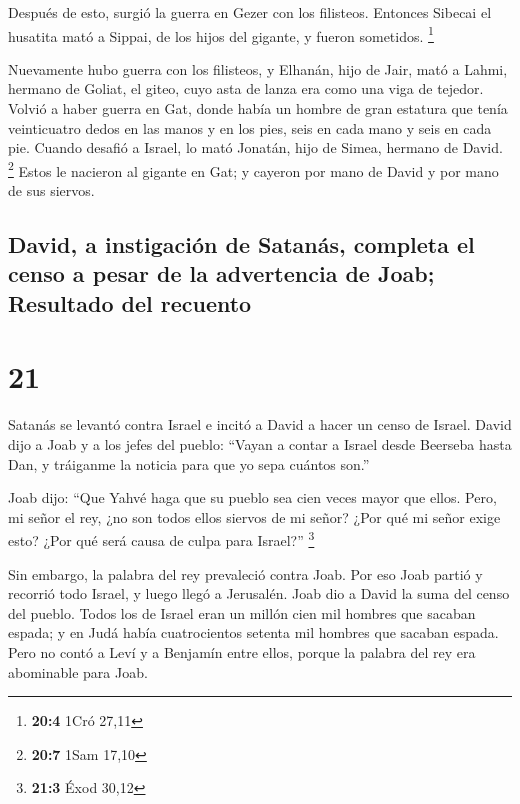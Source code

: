  Después de esto, surgió la guerra en Gezer con los
filisteos. Entonces Sibecai el husatita mató a Sippai, de los hijos del
gigante, y fueron sometidos. \footnote{\textbf{20:4} 1Cró 27,11}

 Nuevamente hubo guerra con los filisteos, y Elhanán, hijo
de Jair, mató a Lahmi, hermano de Goliat, el giteo, cuyo asta de lanza
era como una viga de tejedor.  Volvió a haber guerra en
Gat, donde había un hombre de gran estatura que tenía veinticuatro dedos
en las manos y en los pies, seis en cada mano y seis en cada pie.
 Cuando desafió a Israel, lo mató Jonatán, hijo de Simea,
hermano de David. \footnote{\textbf{20:7} 1Sam 17,10} 
Estos le nacieron al gigante en Gat; y cayeron por mano de David y por
mano de sus siervos.

\hypertarget{david-a-instigaciuxf3n-de-satanuxe1s-completa-el-censo-a-pesar-de-la-advertencia-de-joab-resultado-del-recuento}{%
\subsection{David, a instigación de Satanás, completa el censo a pesar
de la advertencia de Joab; Resultado del
recuento}\label{david-a-instigaciuxf3n-de-satanuxe1s-completa-el-censo-a-pesar-de-la-advertencia-de-joab-resultado-del-recuento}}

\hypertarget{section-20}{%
\section{21}\label{section-20}}

 Satanás se levantó contra Israel e incitó a David a hacer
un censo de Israel.  David dijo a Joab y a los jefes del
pueblo: ``Vayan a contar a Israel desde Beerseba hasta Dan, y tráiganme
la noticia para que yo sepa cuántos son.''

 Joab dijo: ``Que Yahvé haga que su pueblo sea cien veces
mayor que ellos. Pero, mi señor el rey, ¿no son todos ellos siervos de
mi señor? ¿Por qué mi señor exige esto? ¿Por qué será causa de culpa
para Israel?'' \footnote{\textbf{21:3} Éxod 30,12}

 Sin embargo, la palabra del rey prevaleció contra Joab.
Por eso Joab partió y recorrió todo Israel, y luego llegó a Jerusalén.
 Joab dio a David la suma del censo del pueblo. Todos los
de Israel eran un millón cien mil hombres que sacaban espada; y en Judá
había cuatrocientos setenta mil hombres que sacaban espada.
 Pero no contó a Leví y a Benjamín entre ellos, porque la
palabra del rey era abominable para Joab.

